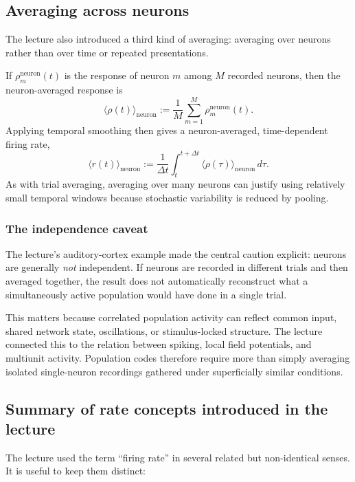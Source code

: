 \documentclass[11pt]{article}
\begin{document}
\subsection{Averaging across neurons}

The lecture also introduced a third kind of averaging: averaging over neurons rather than over time or repeated presentations.

If $\rho^{\mathrm{neuron}}_m(t)$ is the response of neuron $m$ among $M$ recorded neurons, then the neuron-averaged response is
\[
\langle \rho(t) \rangle_{\mathrm{neuron}} :=
\frac{1}{M}\sum_{m=1}^{M} \rho^{\mathrm{neuron}}_m(t).
\]
Applying temporal smoothing then gives a neuron-averaged, time-dependent firing rate,
\[
\langle r(t) \rangle_{\mathrm{neuron}} :=
\frac{1}{\Delta t}\int_t^{t+\Delta t} \langle \rho(\tau) \rangle_{\mathrm{neuron}}\,d\tau.
\]
As with trial averaging, averaging over many neurons can justify using relatively small temporal windows because stochastic variability is reduced by pooling.

\subsubsection{The independence caveat}

The lecture's auditory-cortex example made the central caution explicit: neurons are generally \emph{not} independent. If neurons are recorded in different trials and then averaged together, the result does not automatically reconstruct what a simultaneously active population would have done in a single trial.

This matters because correlated population activity can reflect common input, shared network state, oscillations, or stimulus-locked structure. The lecture connected this to the relation between spiking, local field potentials, and multiunit activity. Population codes therefore require more than simply averaging isolated single-neuron recordings gathered under superficially similar conditions.

\subsection{Summary of rate concepts introduced in the lecture}

The lecture used the term ``firing rate'' in several related but non-identical senses. It is useful to keep them distinct:
\end{document}
